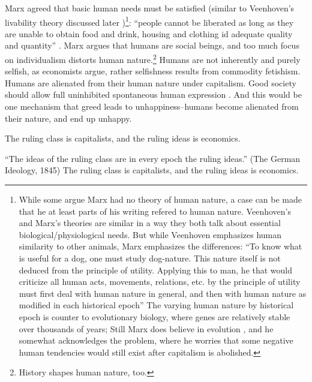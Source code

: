 \documentclass[10pt, letterpaper]{article}
\begin{document}
\begin{spacing}{1.8}
Marx agreed that basic human needs must be satisfied (similar to Veenhoven's
livability theory discussed later \citep{veenhoven14b})\footnote{While some
  argue Marx had no theory of human nature, a case can be made that he at least
  parts of his writing refered to human nature. 
%
  Veenhoven's and Marx's theories are
  similar in a way they both talk about essential biological/physiological
  needs. But while Veenhoven emphasizes human similarity to other animals, Marx
emphasizes the differences: ``To know what is useful for a dog, one must study dog-nature. This nature
itself is not deduced from the principle of utility. Applying this to man, he
that would criticize all human acts, movements, relations, etc. by the principle
of utility must first deal with human nature in general, and then with human
nature as modified in each historical epoch''\citep[quoted in][p. 83]{struhl16}
The varying human nature by historical epoch is counter to evolutionary biology, where genes are relatively
stable over thousands of years; Still Marx does believe in  evolution \citep{heyer82},
and he somewhat acknowledges the problem, where he
worries that some negative human tendencies would still exist after capitalism is abolished.}: ``people cannot be
liberated as long as they are unable to obtain food and drink, housing and
clothing id adequate quality and quantity'' \citep[cited in][p. 70]{geras83}.
Marx argues that humans are social beings, and too much focus on individualism distorts human
nature.\footnote{History shapes human nature, too.}  Humans are not inherently
and purely selfish, as economists argue, rather selfishness results from commodity
fetishism. %
 Humans are alienated from their human nature under capitalism. %
Good society should allow full uninhibited spontaneous human expression %
\citep{marcuse15}. 
%
And this would be one mechanism that greed leads to unhappiness--humans become
alienated from their nature, and end up unhappy. 

The ruling class is capitalists, and the ruling ideas is economics.

``The ideas of the ruling class are in every epoch the ruling ideas.'' (The
German Ideology, 1845)
The ruling class is capitalists, and the ruling ideas is economics.


\end{spacing}
\end{document}
